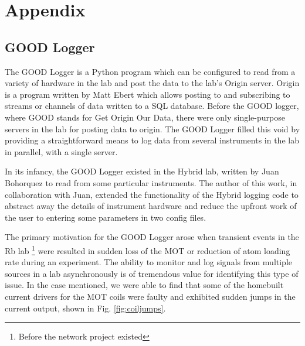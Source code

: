 \part{Appendix}\label{part:appendices}
\chapter{GOOD Logger}\label{ch:template}

The GOOD Logger is a Python program which can be configured to read from a variety of hardware in the lab and post the data to the lab's Origin server. Origin is a program written by Matt Ebert which allows posting to and subscribing to streams or channels of data written to a SQL database. Before the GOOD logger, where GOOD stands for Get Origin Our Data, there were only single-purpose servers in the lab for posting data to origin. The GOOD Logger filled this void by providing a straightforward means to log data from several instruments in the lab in parallel, with a single server. 

In its infancy, the GOOD Logger existed in the Hybrid lab, written by Juan Bohorquez to read from some particular instruments. The author of this work, in collaboration with Juan, extended the functionality of the Hybrid logging code to abstract away the details of instrument hardware and reduce the upfront work of the user to entering some parameters in two config files. 

The primary motivation for the GOOD Logger arose when  transient events in the Rb lab \footnote{Before the network project existed} were resulted in sudden loss of the MOT or reduction of atom loading rate during an experiment. The ability to monitor and log signals from multiple sources in a lab asynchronously is of tremendous value for identifying this type of issue. In the case mentioned, we were able to find that some of the homebuilt current drivers for the MOT coils were faulty and exhibited sudden jumps in the current output, shown in Fig. \ref{fig:coiljumps}.

